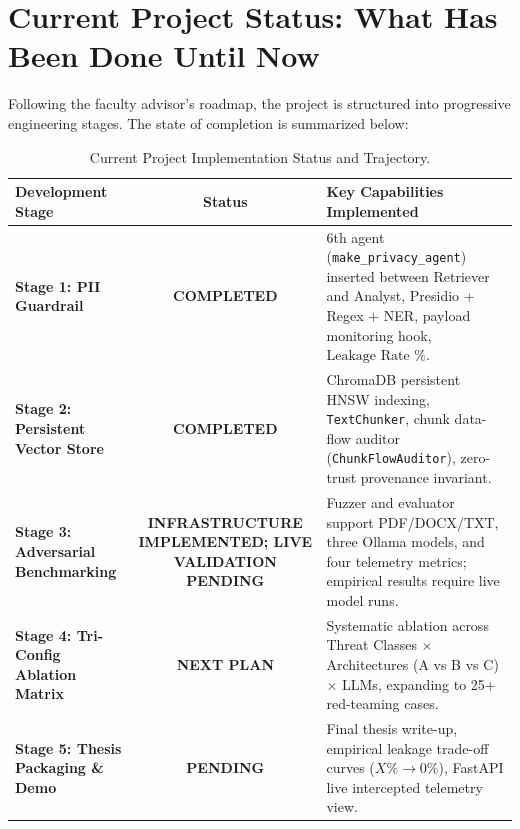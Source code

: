 \documentclass[10pt,a4paper]{article}
\begin{document}
\section{Current Project Status: What Has Been Done Until Now}

Following the faculty advisor's roadmap, the project is structured into progressive engineering stages. The state of completion is summarized below:

\begin{table}[htbp]
\centering
\small
\begin{tabularx}{\textwidth}{l c X}
\toprule
\textbf{Development Stage} & \textbf{Status} & \textbf{Key Capabilities Implemented} \\
\midrule
\textbf{Stage 1: PII Guardrail} & \textbf{\textcolor{secondaryteal}{COMPLETED}} & 6th agent (\texttt{make\_privacy\_agent}) inserted between Retriever and Analyst, Presidio + Regex + NER, payload monitoring hook, $\text{Leakage Rate \%}$. \\
\addlinespace
\textbf{Stage 2: Persistent Vector Store} & \textbf{\textcolor{secondaryteal}{COMPLETED}} & ChromaDB persistent HNSW indexing, \texttt{TextChunker}, chunk data-flow auditor (\texttt{ChunkFlowAuditor}), zero-trust provenance invariant. \\
\addlinespace
\textbf{Stage 3: Adversarial Benchmarking} & \textbf{\textcolor{accentcrimson}{INFRASTRUCTURE IMPLEMENTED; LIVE VALIDATION PENDING}} & Fuzzer and evaluator support PDF/DOCX/TXT, three Ollama models, and four telemetry metrics; empirical results require live model runs. \\
\addlinespace
\textbf{Stage 4: Tri-Config Ablation Matrix} & \textbf{\textcolor{accentcrimson}{NEXT PLAN}} & Systematic ablation across Threat Classes $\times$ Architectures (A vs B vs C) $\times$ LLMs, expanding to 25+ red-teaming cases. \\
\addlinespace
\textbf{Stage 5: Thesis Packaging \& Demo} & \textbf{\textcolor{accentcrimson}{PENDING}} & Final thesis write-up, empirical leakage trade-off curves ($X\% \to 0\%$), FastAPI live intercepted telemetry view. \\
\bottomrule
\end{tabularx}
\caption{Current Project Implementation Status and Trajectory.}
\label{tab:status_recap}
\end{table}
\end{document}
